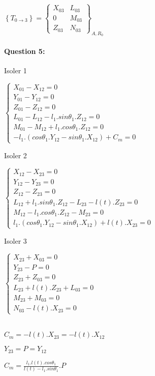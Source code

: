 $\left\{T_{0\rightarrow 3}\right\}=\left\{\begin{array}{cc}
X_{03} & L_{03} \\
0 & M_{03} \\
Z_{03} & N_{03}
\end{array}\right\}_{A,R_0}$

\paragraph{Question 5:}

Isoler 1

$\left\{\begin{array}{l}
X_{01}-X_{12}=0 \\
Y_{01}-Y_{12}=0 \\
Z_{01}-Z_{12}=0 \\
L_{01}-L_{12}-l_1.sin\theta_1.Z_{12}=0 \\
M_{01}-M_{12}+l_1.cos\theta_1.Z_{12}=0 \\
-l_1.(cos\theta_1.Y_{12}-sin\theta_1.X_{12})+C_m=0
\end{array}\right.$

Isoler 2

$\left\{\begin{array}{l}
X_{12}-X_{23}=0 \\
Y_{12}-Y_{23}=0 \\
Z_{12}-Z_{23}=0 \\
L_{12}+l_1.sin\theta_1.Z_{12}-L_{23}-l(t).Z_{23}=0 \\
M_{12}-l_1.cos\theta_1.Z_{12}-M_{23}=0 \\
l_1.(cos\theta_1.Y_{12}-sin\theta_1.X_{12})+l(t).X_{23}=0
\end{array}\right.$

Isoler 3

$\left\{\begin{array}{l}
X_{23}+X_{03}=0 \\
Y_{23}-P=0 \\
Z_{23}+Z_{03}=0 \\
L_{23}+l(t).Z_{23}+L_{03}=0 \\
M_{23}+M_{03}=0 \\
N_{03}-l(t).X_{23}=0
\end{array}\right.$

~\ \\
$C_m=-l(t).X_{23}=-l(t).X_{12}$

$Y_{23}=P=Y_{12}$

$C_m=\frac{l_1.l(t).cos\theta_1}{l(t)-l_1.sin\theta_1}.P$



